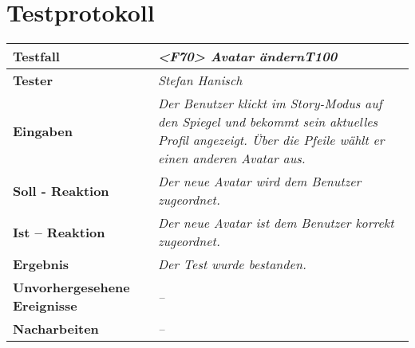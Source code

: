 \section{Testprotokoll}

\begin{longtable}{|p{4cm}|p{11cm}|}
\hline
\textbf{Testfall} & \textit{<F70> Avatar ändern\textbf{T100}} \\
\hline
\textbf{Tester} & \textit{Stefan Hanisch} \\
\hline
\textbf{Eingaben} & \textit{Der Benutzer klickt im Story-Modus auf den Spiegel und bekommt sein aktuelles Profil angezeigt. Über die Pfeile wählt er einen anderen Avatar aus.} \\
\hline
\textbf{Soll - Reaktion} & \textit{Der neue Avatar wird dem Benutzer zugeordnet.} \\
\hline
\textbf{Ist -- Reaktion} & \textit{Der neue Avatar ist dem Benutzer korrekt zugeordnet.} \\
\hline
\textbf{Ergebnis} & \textit{Der Test wurde bestanden.} \\
\hline
\textbf{Unvorhergesehene Ereignisse} &
\textit{--} \\
\hline
\textbf{Nacharbeiten } & \textit{--} \\
\hline
\end{longtable}
